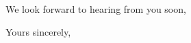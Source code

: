 \documentclass[11pt]{letter}
\begin{document}
\begin{letter}{}
We look forward to hearing from you soon,

\closing{Yours sincerely,}




%
%









\end{letter}
\end{document}
